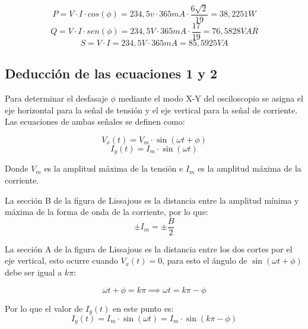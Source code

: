 \begin{equation*}
    P = V \cdot I \cdot cos(\phi) = 234,5v \cdot 365mA \cdot \frac{6\sqrt{2}}{19} = 38,2251 W
\end{equation*}
\begin{equation*}
    Q = V \cdot I \cdot sen(\phi) = 234,5V \cdot 365mA \cdot \frac{17}{19} =  76,5828 VAR
\end{equation*}
\begin{equation*}
    S = V \cdot I = 234,5V \cdot 365mA = 85,5925 VA
\end{equation*}

\subsection{Deducción de las ecuaciones 1 y 2}

Para determinar el desfasaje $\phi$ mediante el modo X-Y del osciloscopio se asigna el eje horizontal para la señal de tensión y el eje vertical para la señal de corriente. Las ecuaciones de ambas señales se definen como:

\begin{equation*}
    V_x(t) = V_m \cdot \sin(\omega t + \phi)
\end{equation*}
\begin{equation*}
    I_y(t) = I_m \cdot \sin(\omega t )
\end{equation*}

Donde $V_m$ es la amplitud máxima de la tensión e $I_m$ es la amplitud máxima de la corriente.

La sección B de la figura de Lissajous es la distancia entre la amplitud mínima y máxima de la forma de onda de la corriente, por lo que:
\begin{equation*}
    \pm I_m =\pm  \frac{B}{2}
\end{equation*}

La sección A de la figura de Lissajous es la distancia entre los dos cortes por el eje vertical, esto ocurre cuando $V_x(t) = 0$, para esto el ángulo de $\sin(\omega t + \phi)$ debe ser igual a $k\pi$:

\begin{equation*}
    \omega t + \phi = k\pi \implies \omega t = k\pi - \phi
\end{equation*}

Por lo que el valor de $I_y(t)$ en este punto es:
\begin{equation*}
    I_y(t) = I_m \cdot \sin(\omega t) = I_m \cdot \sin(k\pi - \phi)
\end{equation*}

